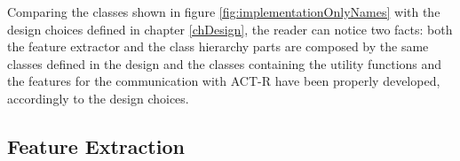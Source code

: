 	Comparing the classes shown in figure \ref{fig:implementationOnlyNames} with the design choices defined in chapter \ref{chDesign}, the reader can notice two facts: both the feature extractor and the class hierarchy parts are composed by the same classes defined in the design and the classes containing the utility functions and the features for the communication with \mbox{ACT-R} have been properly developed, accordingly to the design choices.

	\subsection{Feature Extraction}
	
		\begin{figure}[h]
		  \begin{center} 
		  \end{center} 
		  \caption{\textit{}}  
		  \label{fig:extraction and client server}
	 	\end{figure}	



